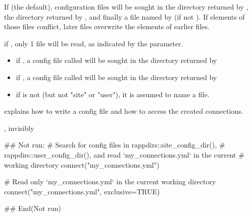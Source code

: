 \documentclass[a4paper]{book}
\begin{document}
%
\begin{Details}\relax
If  (the default), configuration files will be sought in the
directory returned by , the directory returned
by , and finally a file named by
 (if not ). If elements of those files conflict, later
files overwrite the elements of earlier files.

if , only 1 file will be read, as indicated by the
 parameter.
\begin{itemize}

\item{} if , a config file called
 will be sought in the directory returned by
\item{} if , a config file called
 will be sought in the directory returned by
\item{} if  is not  (but not "site" or "user"), it is
assumed to name a file.

\end{itemize}


 explains how to write a
config file and how to access the created connections.
\end{Details}
%
\begin{Value}
, invisibly
\end{Value}
%
\begin{Examples}
\begin{ExampleCode}
## Not run: 
# Search for config files in rappdirs::site_config_dir(),
# rappdirs::user_config_dir(), and read `my_connections.yml` in the current
# working directory
connect("my_connections.yml")

# Read only `my_connections.yml` in the current working directory
connect("my_connections.yml", exclusive=TRUE)

## End(Not run)
\end{ExampleCode}
\end{Examples}
\end{document}
